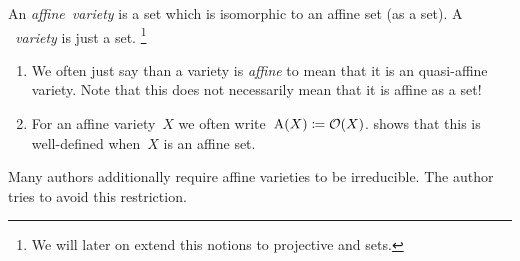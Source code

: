 \begin{definition}
  An \emph{affine~variety} is a {\qaffine} set which is isomorphic to an affine set (as a {\qaffine} set).
  A \emph{{\qaffine}~variety} is just a {\qaffine} set.%
  \footnote{We will later on extend this notions to projective and {\qprojective} sets.}
\end{definition}


\begin{notation}
  \leavevmode
  \begin{enumerate}
    \item
      We often just say than a {\qaffine} variety is \emph{affine} to mean that it is an quasi-affine variety.
      Note that this does not necessarily mean that it is affine as a set!
    \item
      For an affine variety~$X$ we often write~$\operatorname{A}(X) \coloneqq \mathcal{O}(X)$.
       shows that this is well-defined when~$X$ is an affine set.
  \end{enumerate}
\end{notation}


\begin{remark}
  Many authors additionally require affine varieties to be irreducible.
  The author tries to avoid this restriction.
\end{remark}


